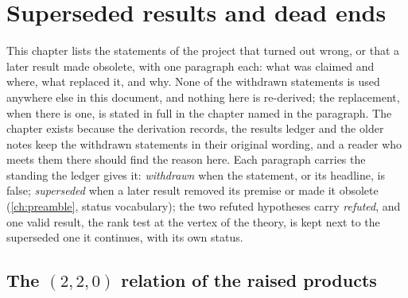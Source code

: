 \section{Superseded results and dead ends}
\label{ch:dead-ends}

This chapter lists the statements of the project that turned out wrong, or that a later result made obsolete, with one paragraph each: what was claimed and where, what replaced it, and why.
None of the withdrawn statements is used anywhere else in this document, and nothing here is re-derived; the replacement, when there is one, is stated in full in the chapter named in the paragraph.
The chapter exists because the derivation records, the results ledger and the older notes keep the withdrawn statements in their original wording, and a reader who meets them there should find the reason here.
Each paragraph carries the standing the ledger gives it: \emph{withdrawn} when the statement, or its headline, is false; \emph{superseded} when a later result removed its premise or made it obsolete (\cref{ch:preamble}, status vocabulary); the two refuted hypotheses carry \emph{refuted}, and one valid result, the rank test at the vertex of the theory, is kept next to the superseded one it continues, with its own status.

\subsection{The \texorpdfstring{$(2, 2, 0)$}{(2,2,0)} relation of the raised products}

